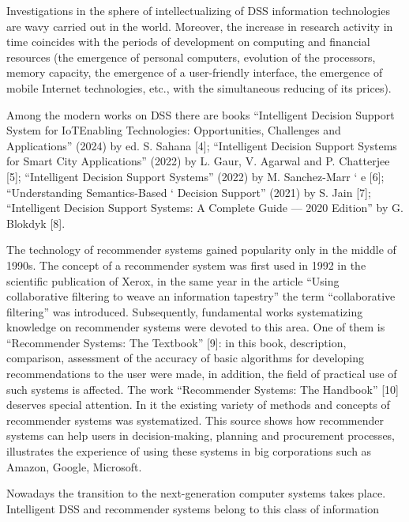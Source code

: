 \documentclass[10pt, a4paper]{article}
\begin{document}
\begin{multicols}{2}
Investigations in the sphere of intellectualizing of
DSS information technologies are wavy carried out in
the world. Moreover, the increase in research activity
in time coincides with the periods of development on
computing and financial resources (the emergence of
personal computers, evolution of the processors, memory
capacity, the emergence of a user-friendly interface, the
emergence of mobile Internet technologies, etc., with the
simultaneous reducing of its prices).

Among the modern works on DSS there are
books “Intelligent Decision Support System for IoTEnabling Technologies: Opportunities, Challenges and
Applications” (2024) by ed. S. Sahana [4]; “Intelligent
Decision Support Systems for Smart City Applications”
(2022) by L. Gaur, V. Agarwal and P. Chatterjee [5];
“Intelligent Decision Support Systems” (2022) by M.
Sanchez-Marr ` e [6]; “Understanding Semantics-Based `
Decision Support” (2021) by S. Jain [7]; “Intelligent
Decision Support Systems: A Complete Guide — 2020
Edition” by G. Blokdyk [8].

The technology of recommender systems gained
popularity only in the middle of 1990s. The concept
of a recommender system was first used in 1992
in the scientific publication of Xerox, in the same
year in the article “Using collaborative filtering to
weave an information tapestry” the term “collaborative
filtering” was introduced. Subsequently, fundamental
works systematizing knowledge on recommender systems
were devoted to this area. One of them is “Recommender
Systems: The Textbook” [9]: in this book, description,
comparison, assessment of the accuracy of basic
algorithms for developing recommendations to the user
were made, in addition, the field of practical use of
such systems is affected. The work “Recommender
Systems: The Handbook” [10] deserves special attention.
In it the existing variety of methods and concepts of
recommender systems was systematized. This source
shows how recommender systems can help users in
decision-making, planning and procurement processes,
illustrates the experience of using these systems in big
corporations such as Amazon, Google, Microsoft.

Nowadays the transition to the next-generation
computer systems takes place. Intelligent DSS and
recommender systems belong to this class of information
\end{multicols}
\end{document}

